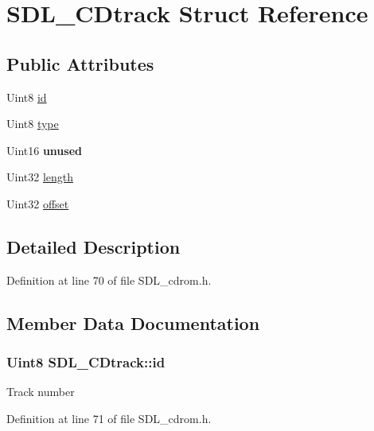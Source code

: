 \hypertarget{structSDL__CDtrack}{\section{S\+D\+L\+\_\+\+C\+Dtrack Struct Reference}
\label{structSDL__CDtrack}
}
\subsection*{Public Attributes}
\begin{DoxyCompactItemize}
\item 
Uint8 \hyperlink{structSDL__CDtrack_aee8f951ef762bef0ab46e7424ad6c6a4}{id}
\item 
Uint8 \hyperlink{structSDL__CDtrack_adc74ef4de78c8418f229e3efd24a076f}{type}
\item 
\hypertarget{structSDL__CDtrack_a2ec24a93792ff7a537f7554a89d596cf}{Uint16 {\bfseries unused}}\label{structSDL__CDtrack_a2ec24a93792ff7a537f7554a89d596cf}

\item 
Uint32 \hyperlink{structSDL__CDtrack_a15ae81e65a360c3a334e4323af6f2da5}{length}
\item 
Uint32 \hyperlink{structSDL__CDtrack_a5c0875650889c529cefee6c2684901f5}{offset}
\end{DoxyCompactItemize}


\subsection{Detailed Description}


Definition at line 70 of file S\+D\+L\+\_\+cdrom.\+h.



\subsection{Member Data Documentation}
\hypertarget{structSDL__CDtrack_aee8f951ef762bef0ab46e7424ad6c6a4}{
\subsubsection[{id}]{\setlength{\rightskip}{0pt plus 5cm}Uint8 S\+D\+L\+\_\+\+C\+Dtrack\+::id}}\label{structSDL__CDtrack_aee8f951ef762bef0ab46e7424ad6c6a4}
Track number 

Definition at line 71 of file S\+D\+L\+\_\+cdrom.\+h.

